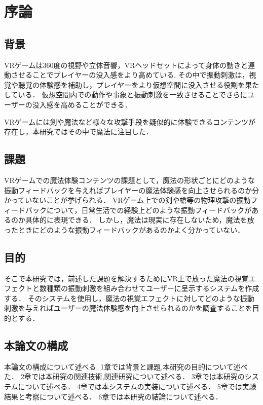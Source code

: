 \chapter{序論}
\section{背景}
VRゲームは360度の視野や立体音響，VRヘッドセットによって身体の動きと連動させることでプレイヤーの没入感をより高めている.
その中で振動刺激は，視覚や聴覚の体験感を補助し，プレイヤーをより仮想空間に没入させる役割を果たしている．
仮想空間内での動作や事象と振動刺激を一致させることでさらにユーザーの没入感を高めることができる．

VRゲームには剣や魔法など様々な攻撃手段を疑似的に体験できるコンテンツが存在し，本研究ではその中で魔法に注目した．


\section{課題}
VRゲームでの魔法体験コンテンツの課題として，魔法の形状ごとにどのような振動フィードバックを与えればプレイヤーの魔法体験感を向上させられるのか分かっていないことが挙げられる．
VRゲーム上での剣や槍等の物理攻撃の振動フィードバックについて，日常生活での経験上どのような振動フィードバックがあるのか具体的に表現できる．
しかし，魔法は現実に存在しないため，魔法を放ったときにどのような振動フィードバックがあるのかよく分かっていない．


\section{目的}
そこで本研究では，前述した課題を解決するためにVR上で放った魔法の視覚エフェクトと数種類の振動刺激を組み合わせてユーザーに呈示するシステムを作成する．
そのシステムを使用し，魔法の視覚エフェクトに対してどのような振動刺激を与えればユーザーの魔法体験感を向上させられるのかを調査することを目的とする．

\section{本論文の構成}
本論文の構成について述べる.
1章では背景と課題,本研究の目的について述べた．
2章では本研究の関連技術,関連研究について述べる．
3章では本研究のシステムについて述べる．
4章では本システムの実装について述べる．
5章では実験結果と考察について述べる．
6章では本研究の結論について述べる．
